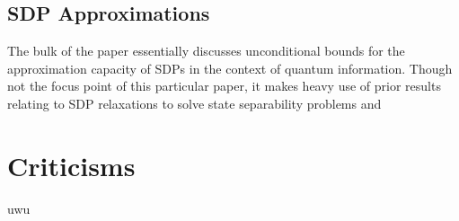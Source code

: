 \documentclass[runningheads,a4paper,english]{llncs}[2022/01/12]
\begin{document}
\subsection{SDP Approximations}
The bulk of the paper essentially discusses unconditional bounds for the approximation capacity of SDPs in the context of quantum information.
Though not the focus point of this particular paper, it makes heavy use of prior results relating to SDP relaxations to solve state separability problems and 

\section{Criticisms}
\label{sec:criticisms}
uwu





\renewcommand{\bibsection}{\section*{References}} %

\begingroup
  \small %
  
\endgroup
\end{document}
